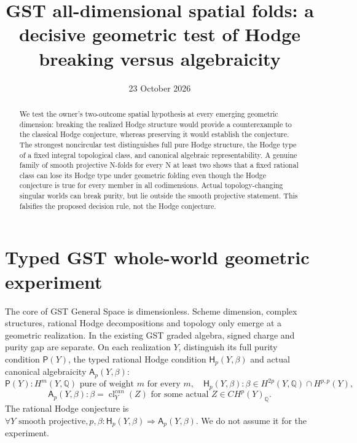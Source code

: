 \documentclass[11pt]{article}
\title{GST all-dimensional spatial folds: a decisive geometric test of Hodge breaking versus algebraicity}
\date{23 October 2026}
\begin{document}
\maketitle
\begin{abstract}
We test the owner's two-outcome spatial hypothesis at every emerging geometric dimension: breaking the realized Hodge structure would provide a counterexample to the classical Hodge conjecture, whereas preserving it would establish the conjecture. The strongest noncircular test distinguishes full pure Hodge structure, the Hodge type of a fixed integral topological class, and canonical algebraic representability. A genuine family of smooth projective N-folds for every N at least two shows that a fixed rational class can lose its Hodge type under geometric folding even though the Hodge conjecture is true for every member in all codimensions. Actual topology-changing singular worlds can break purity, but lie outside the smooth projective statement. This falsifies the proposed decision rule, not the Hodge conjecture.
\end{abstract}
\section{Typed GST whole-world geometric experiment}
The core of GST General Space is dimensionless. Scheme dimension, complex structures, rational Hodge decompositions and topology only emerge at a geometric realization. In the existing GST graded algebra, signed charge and purity gap are separate. On each realization $Y$, distinguish its full purity condition $\mathsf P(Y)$, the typed rational Hodge condition $\mathsf H_p(Y,\beta)$ and actual canonical algebraicity $\mathsf A_p(Y,\beta)$:
\[
 \mathsf P(Y): H^m(Y,\mathbb Q)\text{ pure of weight }m\text{ for every }m,\quad
 \mathsf H_p(Y,\beta):\beta\in H^{2p}(Y,\mathbb Q)\cap H^{p,p}(Y),
\]
\[
 \mathsf A_p(Y,\beta):\beta=\operatorname{cl}^{can}_Y(Z)
 \text{ for some actual }Z\in CH^p(Y)_{\mathbb Q}.
\]
The rational Hodge conjecture is
$\forall Y\text{ smooth projective},p,\beta:\mathsf H_p(Y,\beta)\Rightarrow\mathsf A_p(Y,\beta)$.
We do not assume it for the experiment.
\end{document}
